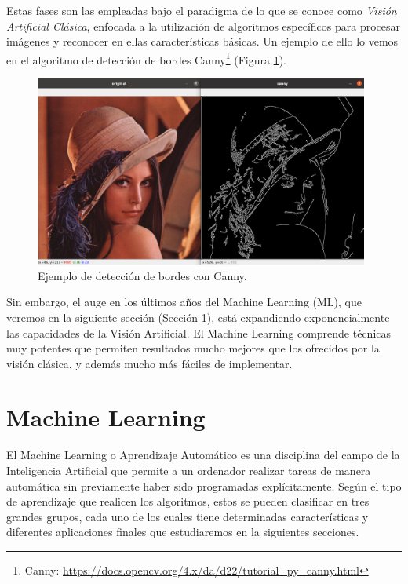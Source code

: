 Estas fases son las empleadas bajo el paradigma de lo que se conoce como \textit{Visión Artificial Clásica}, enfocada a la utilización de algoritmos específicos para procesar imágenes y reconocer en ellas características básicas. Un ejemplo de ello lo vemos en el algoritmo de detección de bordes Canny\footnote{Canny: \url{https://docs.opencv.org/4.x/da/d22/tutorial_py_canny.html}} (Figura \ref{fig:canny}).\\

\begin{figure} [h!]
  \begin{center}
    \includegraphics[width=11cm]{figs/canny.png}
  \end{center}
  \caption{Ejemplo de detección de bordes con Canny.}
  \label{fig:canny}
\end{figure}

Sin embargo, el auge en los últimos años del Machine Learning (ML), que veremos en la siguiente sección (Sección \ref{sec:machine_learning}), está expandiendo exponencialmente las capacidades de la Visión Artificial. El Machine Learning comprende técnicas muy potentes que permiten resultados mucho mejores que los ofrecidos por la visión clásica, y además mucho más fáciles de implementar.

\section{Machine Learning}
\label{sec:machine_learning}

El Machine Learning o Aprendizaje Automático es una disciplina del campo de la Inteligencia Artificial que permite a un ordenador realizar tareas de manera automática sin previamente haber sido programadas explícitamente. Según el tipo de aprendizaje que realicen los algoritmos, estos se pueden clasificar en tres grandes grupos, cada uno de los cuales tiene determinadas características y diferentes aplicaciones finales que estudiaremos en la siguientes secciones.

